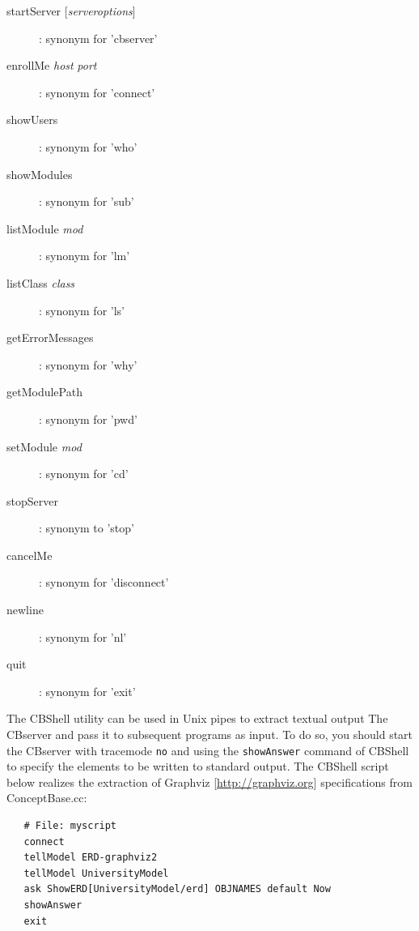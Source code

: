 \begin{description}

\item[{startServer [{\it serveroptions}]}] :
      synonym for 'cbserver'

\item[enrollMe {\it host} {\it port}] :
      synonym for 'connect'

\item[showUsers] :
      synonym for 'who'

\item[showModules] :
      synonym for 'sub'

\item[listModule {\it mod}] :
      synonym for 'lm'

\item[listClass {\it class}] :
      synonym for 'ls'

\item[getErrorMessages] :
      synonym for 'why'

\item[getModulePath] :
      synonym for 'pwd'

\item[setModule {\it mod}] :
      synonym for 'cd'

\item[stopServer] :
      synonym to 'stop'

\item[cancelMe] :
      synonym for 'disconnect'

\item[newline] :
      synonym for 'nl'

\item[quit] :
     synonym for 'exit'

\end{description}

The CBShell utility can be used in Unix pipes to extract textual output The CBserver and
pass it to subsequent programs as input. To do so, you should start the CBserver with
tracemode {\tt no} and using the {\tt showAnswer}  command of CBShell to specify the elements
to be written to standard output. The CBShell script below realizes the extraction of 
Graphviz [\url{http://graphviz.org}] specifications from ConceptBase.cc:

\begin{verbatim}
   # File: myscript
   connect
   tellModel ERD-graphviz2
   tellModel UniversityModel
   ask ShowERD[UniversityModel/erd] OBJNAMES default Now
   showAnswer
   exit
\end{verbatim}



